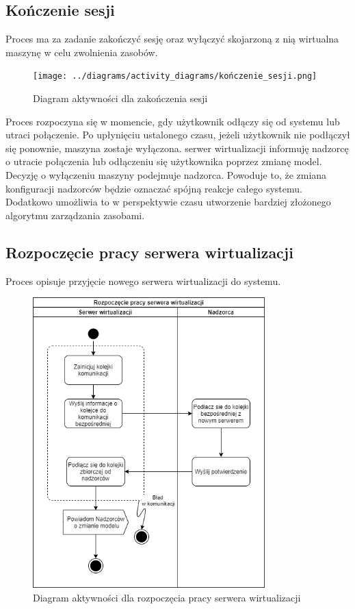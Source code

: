 \documentclass[../opis-rozwiazania.tex]{subfiles}
\begin{document}
\subsection{Kończenie sesji}

Proces ma za zadanie zakończyć sesję oraz wyłączyć skojarzoną z nią wirtualna maszynę w celu zwolnienia zasobów.

\begin{figure}[H]
    \centering
    \texttt{[image: ../diagrams/activity\_diagrams/kończenie\_sesji.png]}
    \caption{Diagram aktywności dla zakończenia sesji}
    \label{finish_session}
\end{figure}

Proces rozpoczyna się w momencie, gdy użytkownik odłączy się od systemu lub utraci połączenie. Po upłynięciu ustalonego czasu, jeżeli użytkownik nie podłączył się ponownie, maszyna zostaje wyłączona.
serwer wirtualizacji informuję nadzorcę o utracie połączenia lub odłączeniu się użytkownika poprzez zmianę model.
Decyzję o wyłączeniu maszyny podejmuje nadzorca.
Powoduje to, że zmiana konfiguracji nadzorców będzie oznaczać spójną reakcje całego systemu.
Dodatkowo umożliwia to w perspektywie czasu utworzenie bardziej złożonego algorytmu zarządzania zasobami. %

\subsection{Rozpoczęcie pracy serwera wirtualizacji}

Proces opisuje przyjęcie nowego serwera wirtualizacji do systemu.

\begin{figure}[H]
    \centering
    \includegraphics[width=0.8\textwidth]{../diagrams/activity_diagrams/serwer_start.png}
    \caption{Diagram aktywności dla rozpoczęcia pracy serwera wirtualizacji}
    \label{start_virtsrv}
\end{figure}
\end{document}

